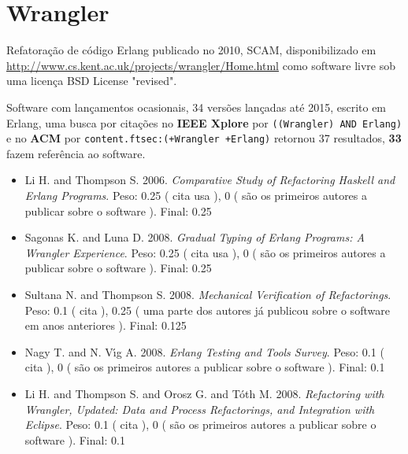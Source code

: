 \section{Wrangler}

Refatoração de código Erlang
publicado no 2010, SCAM,
disponibilizado em \url{http://www.cs.kent.ac.uk/projects/wrangler/Home.html}
como software livre
sob uma licença BSD License "revised".

Software com lançamentos ocasionais,
34 versões lançadas
até 2015,
escrito em Erlang,
uma busca por citações no {\bf IEEE Xplore} por
\texttt{((Wrangler) AND Erlang)}
e no {\bf ACM} por
\texttt{content.ftsec:(+Wrangler +Erlang)}
retornou
37 resultados,
{\bf 33} fazem referência ao software.

\begin{itemize}
\item Li H. and Thompson S.
      2006.
        \textit{ Comparative Study of Refactoring Haskell and Erlang Programs}.
      Peso:
      0.25 (
          cita
          usa
      ),
      0 (
são os primeiros autores a publicar sobre o software
      ).
      Final:
      0.25

\item Sagonas K. and Luna D.
      2008.
        \textit{ Gradual Typing of Erlang Programs: A Wrangler Experience}.
      Peso:
      0.25 (
          cita
          usa
      ),
      0 (
são os primeiros autores a publicar sobre o software
      ).
      Final:
      0.25

\item Sultana N. and Thompson S.
      2008.
        \textit{ Mechanical Verification of Refactorings}.
      Peso:
      0.1 (
          cita
      ),
      0.25 (
uma parte dos autores já publicou sobre o software em anos anteriores
      ).
      Final:
      0.125

\item Nagy T. and N. V\'{\i}g A.
      2008.
        \textit{ Erlang Testing and Tools Survey}.
      Peso:
      0.1 (
          cita
      ),
      0 (
são os primeiros autores a publicar sobre o software
      ).
      Final:
      0.1

\item Li H. and Thompson S. and Orosz G. and T\'{o}th M.
      2008.
        \textit{ Refactoring with Wrangler, Updated: Data and Process Refactorings, and Integration with Eclipse}.
      Peso:
      0.1 (
          cita
      ),
      0 (
são os primeiros autores a publicar sobre o software
      ).
      Final:
      0.1


\end{itemize}
